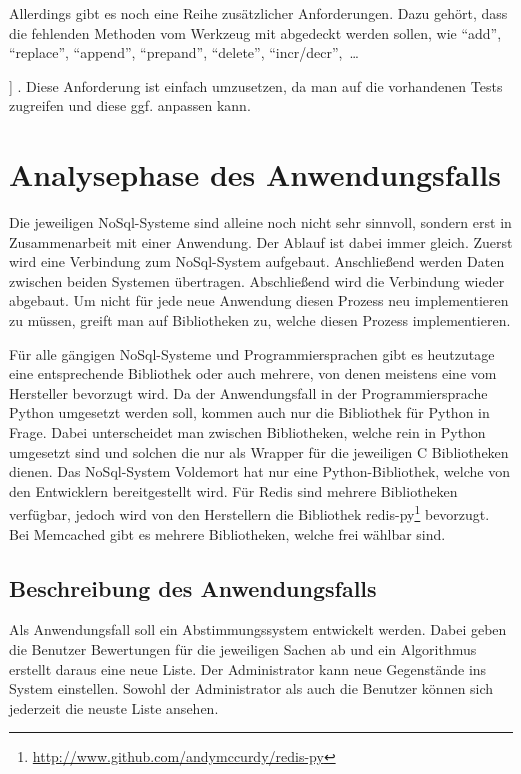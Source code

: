 Allerdings gibt es noch eine Reihe zusätzlicher Anforderungen. Dazu gehört,
dass die fehlenden Methoden vom Werkzeug mit abgedeckt werden sollen, wie
\enquote{add}, \enquote{replace}, \enquote{append}, \enquote{prepand},
\enquote{delete}, \enquote{incr/decr},~\dots{] . Diese Anforderung ist einfach
umzusetzen, da man auf die vorhandenen Tests zugreifen und diese ggf. anpassen
kann.

\section{Analysephase des Anwendungsfalls}
Die jeweiligen NoSql-Systeme sind alleine noch nicht sehr sinnvoll, sondern erst
in Zusammenarbeit mit einer Anwendung. Der Ablauf ist dabei immer gleich. Zuerst
wird eine Verbindung zum NoSql-System aufgebaut. Anschließend werden Daten
zwischen beiden Systemen übertragen. Abschließend wird die Verbindung wieder
abgebaut. Um nicht für jede neue Anwendung diesen Prozess neu implementieren zu
müssen, greift man auf Bibliotheken zu, welche diesen Prozess implementieren.

Für alle gängigen NoSql-Systeme und Programmiersprachen gibt es heutzutage eine
entsprechende Bibliothek oder auch mehrere, von denen meistens eine vom
Hersteller bevorzugt wird. Da der Anwendungsfall in der Programmiersprache
Python umgesetzt werden soll, kommen auch nur die Bibliothek für Python in
Frage. Dabei unterscheidet man zwischen Bibliotheken, welche rein in Python
umgesetzt sind und solchen die nur als Wrapper für die jeweiligen C Bibliotheken
dienen. Das NoSql-System Voldemort hat nur eine Python-Bibliothek, welche von
den Entwicklern bereitgestellt wird. Für Redis sind mehrere Bibliotheken
verfügbar, jedoch wird von den Herstellern die Bibliothek
redis-py\footnote{\url{http://www.github.com/andymccurdy/redis-py}} bevorzugt.
Bei Memcached gibt es mehrere Bibliotheken, welche frei wählbar sind.

\subsection{Beschreibung des Anwendungsfalls}
Als Anwendungsfall soll ein Abstimmungssystem entwickelt werden. Dabei geben
die Benutzer Bewertungen für die jeweiligen Sachen ab und ein Algorithmus
erstellt daraus eine neue Liste. Der Administrator kann neue Gegenstände ins
System einstellen. Sowohl der Administrator als auch die Benutzer können sich
jederzeit die neuste Liste ansehen.

}
